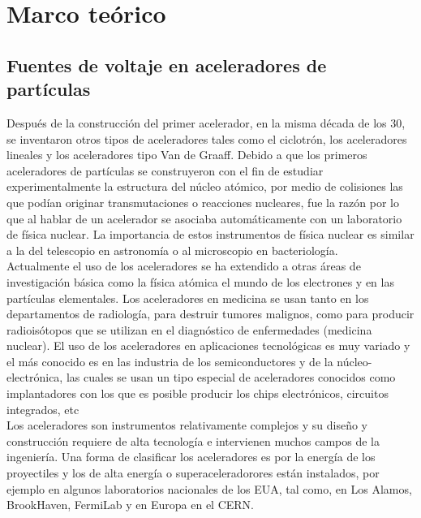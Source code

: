 

\chapter{Marco teórico}
\section{Fuentes de voltaje en aceleradores de partículas}

Después de la construcción del primer acelerador, en la misma década de los
30, se inventaron otros tipos de aceleradores tales como el ciclotrón, los
aceleradores lineales y los aceleradores tipo Van de Graaff. Debido a que los
primeros aceleradores de partículas se construyeron con el fin de estudiar
experimentalmente la estructura del núcleo atómico, por medio de colisiones las que
podían originar transmutaciones o reacciones nucleares, fue la razón por lo que al
hablar de un acelerador se asociaba automáticamente con un laboratorio de física
nuclear. La importancia de estos instrumentos de física nuclear es similar a la del
telescopio en astronomía o al microscopio en bacteriología.\\

 Actualmente el uso de
los aceleradores se ha extendido a otras áreas de investigación básica como la
física atómica el mundo de los electrones y en las partículas elementales. Los
aceleradores en medicina se usan tanto en los departamentos de radiología, para
destruir tumores malignos, como para producir radioisótopos que se utilizan en el
diagnóstico de enfermedades (medicina nuclear). El uso de los aceleradores en
aplicaciones tecnológicas es muy variado y el más conocido es en las industria de
los semiconductores y de la núcleo-electrónica, las cuales se usan un tipo especial
de aceleradores conocidos como implantadores con los que es posible producir
los chips electrónicos, circuitos integrados, etc\\

Los aceleradores son instrumentos relativamente complejos y su diseño y
construcción requiere de alta tecnología e intervienen muchos campos de la
ingeniería. Una forma de clasificar los aceleradores es por la energía de los
proyectiles y los de alta energía o superaceleradorores están instalados, por
ejemplo en algunos laboratorios nacionales de los EUA, tal como, en Los Alamos,
BrookHaven, FermiLab y en Europa en el CERN. \\

